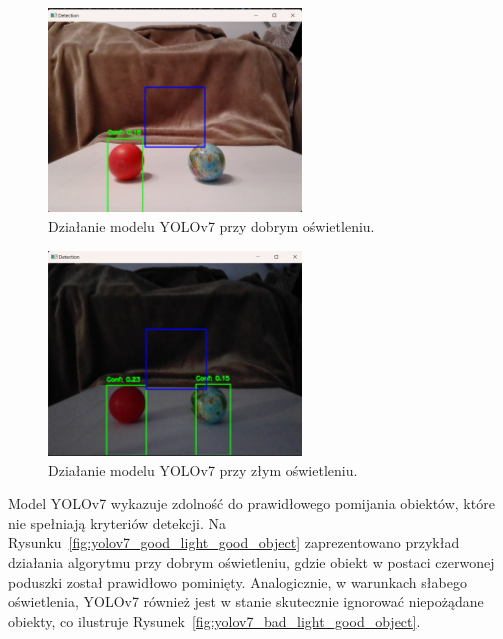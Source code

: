 \documentclass[a4paper,twoside,12pt]{book}
\begin{document}
\begin{figure}[h]
    \centering
    \includegraphics[width=0.6\textwidth]{Images/Porownanie/Yolo7 robot/Zrzut ekranu 2025-01-02 194147.png}
    \caption{Działanie modelu YOLOv7 przy dobrym oświetleniu.}
    \label{fig:yolov7_good_light}
\end{figure}
\begin{figure}[h]
    \centering
    \includegraphics[width=0.6\textwidth]{Images/Porownanie/Yolo7 robot/Zrzut ekranu 2025-01-02 194208.png}
    \caption{Działanie modelu YOLOv7 przy złym oświetleniu.}
    \label{fig:yolov7_bad_light}
\end{figure}

\newpage
Model YOLOv7 wykazuje zdolność do prawidłowego pomijania obiektów, które nie spełniają kryteriów detekcji. Na Rysunku~\ref{fig:yolov7_good_light_good_object} zaprezentowano przykład działania algorytmu przy dobrym oświetleniu, gdzie obiekt w postaci czerwonej poduszki został prawidłowo pominięty. Analogicznie, w warunkach słabego oświetlenia, YOLOv7 również jest w stanie skutecznie ignorować niepożądane obiekty, co ilustruje Rysunek~\ref{fig:yolov7_bad_light_good_object}.
\end{document}
